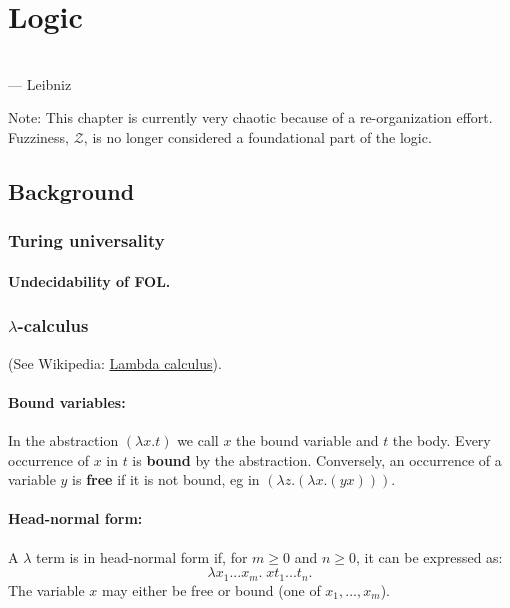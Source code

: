 \chapter{Logic}
\begin{flushright}
\\ --- Leibniz
\end{flushright}
\minitoc

Note:  This chapter is currently very chaotic because of a re-organization effort.  Fuzziness, $\mathcal{Z}$, is no longer considered a foundational part of the logic.

\section{Background}

\subsection{Turing universality}

\subsubsection{Undecidability of FOL.}

\subsection{$\lambda$-calculus}

(See Wikipedia: \href{http://en.wikipedia.org/wiki/Lambda_calculus}{Lambda calculus}).

\subsubsection{Bound variables:}  In the abstraction $(\lambda x.t)$ we call $x$ the bound variable and $t$ the body.  Every occurrence of $x$ in $t$ is \textbf{bound} by the abstraction.  Conversely, an occurrence of a variable $y$ is \textbf{free} if it is not bound, eg in $(\lambda z.(\lambda x.(yx)))$.

\subsubsection{Head-normal form:}  A $\lambda$ term is in head-normal form if, for $m \geq 0$ and $n \geq 0$, it can be expressed as:
$$\lambda x_1 ... x_m . \; x t_1 ... t_n.$$
The variable $x$ may either be free or bound (one of $x_1,...,x_m$).

